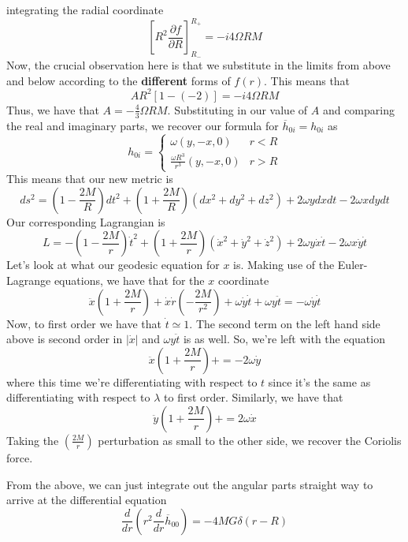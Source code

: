 integrating the radial coordinate 
\[
\left[  R ^ 2 \frac{\partial  f }{\partial  R }   \right] ^{ R _ + }_{ R_{ - } }  =  - i 4 \Omega R M 
\] Now, the crucial observation 
here is that we substitute in the limits from 
above and below according to the \textbf{different} forms 
of $ f \left( r  \right)  $. This means that 
\[
A R ^ 2 \left[  1 - \left(  - 2 \right)   \right]  = - i 4 \Omega R M 
\]  Thus, we have that 
$ A =  - \frac{4}{3 }  \Omega R M $.
Substituting in our value of $ A $ and comparing the real and imaginary parts, we recover
our formula for $ \overline{ h }_{ 0i  }  = h _{ 0i } $   
as 
\[
h_{ 0i }  = \begin{cases}
\omega  \left(  y , -x, 0  \right)  & r < R \\
\frac{\omega  R ^ 3 }{ r ^ 3 }  \left( y , -x , 0  \right)  & r > R 
\end{cases}
\] 
This means that our new metric is 
\[
ds ^ 2  = \left(  1 - \frac{2M}{ R }  \right)  dt ^ 2 + \left(  1 + \frac{2M}{ R }  \right)  
\left( dx ^ 2 + dy ^ 2 + dz ^ 2  \right)  + 2 \omega  y dx dt - 2 \omega x dy dt 
\] Our corresponding Lagrangian is 
\[
L =  - \left(  1 - \frac{2M}{r }  \right) \dot{  t } ^ 2 +  \left(  1 + \frac{2M}{r }  \right) 
\left( \dot{ x } ^ 2 + \dot{ y } ^ 2 + \dot{ z } ^ 2     \right)  + 
2 \omega y \dot{ x } \dot{ t } - 2 \omega x \dot{ y } \dot{ t }     
\] Let's look at what our geodesic equation for 
$ x $ is. Making use of the Euler-Lagrange equations, 
we have that for the $ x $ coordinate 
\[
\ddot{x} \left(  1  +\frac{2M}{ r }  \right)  + \dot{ x } \dot{ r } (  - \frac{2M}{r ^ 2 } ) + 
\omega  \dot{ y } \dot{ t } + \omega y \ddot{t}  = -  \omega \dot{ y } \dot{ t }    
\]  Now, to first order we have that $ \dot{ t } \simeq 1  $. The second term 
on the left hand side above is second order in $ | \dot{ x } |   $ and $ \omega y  \ddot{ t  }$ 
is as well. 
So, we're left with the equation 
\[
\ddot{x} (  1 + \frac{2M}{r } ) +  =  - 2 \omega \dot{ y }   
\]  where this time we're differentiating with respect to $ t $ 
since it's the same as differentiating 
with respect to $ \lambda $ to first order. 
Similarly, we have that \[ 
\ddot{y} (  1 + \frac{2M}{r } ) +  =  2 \omega \dot{ x}   
\] Taking the $ \left( \frac{2M}{ r }  \right)  $ perturbation as 
small to the other side, we recover the Coriolis force.

From the above, 
we can just integrate out 
the angular parts straight way to arrive 
at the differential equation 
\[
	\frac{d}{dr } \left(  r^ 2 
	\frac{d }{ d r } \overline{ h } _{00 } \right)  = - 
	4 M  G \delta \left(  r   - R  \right) 
\] 

